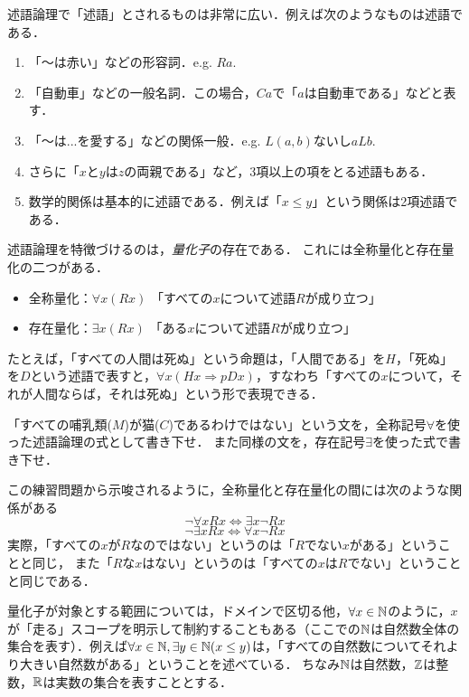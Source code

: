 \documentclass[11pt,a4paper]{jsarticle}
\begin{document}
述語論理で「述語」とされるものは非常に広い．例えば次のようなものは述語である．
\begin{enumerate}
    \item 「〜は赤い」などの形容詞．e.g. $Ra$.
    \item 「自動車」などの一般名詞．この場合，$Ca$で「$a$は自動車である」などと表す．
    \item 「〜は...を愛する」などの関係一般．e.g. $L(a,b)$ないし$aLb$. 
    \item さらに「$x$と$y$は$z$の両親である」など，3項以上の項をとる述語もある．
    \item 数学的関係は基本的に述語である．例えば「$x \leq y$」という関係は2項述語である．
\end{enumerate}

述語論理を特徴づけるのは，\emph{量化子}の存在である．
これには全称量化と存在量化の二つがある．
\begin{itemize}
 \item 全称量化：$\forall x (Rx)$ 「すべての$x$について述語$R$が成り立つ」
 \item 存在量化：$\exists x (Rx)$ 「ある$x$について述語$R$が成り立つ」
\end{itemize}
たとえば，「すべての人間は死ぬ」という命題は，「人間である」を$H$，「死ぬ」を$D$という述語で表すと，$\forall x (Hx \Rightarrow pDx)$，すなわち「すべての$x$について，それが人間ならば，それは死ぬ」という形で表現できる．

\begin{exercise}
    「すべての哺乳類($M$)が猫($C$)であるわけではない」という文を，全称記号$\forall$を使った述語論理の式として書き下せ．
    また同様の文を，存在記号$\exists$を使った式で書き下せ．
\end{exercise}

この練習問題から示唆されるように，全称量化と存在量化の間には次のような関係がある
\[ \neg \forall x Rx \iff \exists x \neg Rx \]
\[ \neg \exists x Rx \iff \forall x \neg Rx \]
実際，「すべての$x$が$R$なのではない」というのは「$R$でない$x$がある」ということと同じ，
また「$R$な$x$はない」というのは「すべての$x$は$R$でない」ということと同じである．

量化子が対象とする範囲については，ドメインで区切る他，$\forall x \in \mathbb{N}$のように，$x$が「走る」スコープを明示して制約することもある（ここでの$\mathbb{N}$は自然数全体の集合を表す）．例えば$\forall x \in \mathbb{N}, \exists y \in \mathbb{N} (x \leq y)$は，「すべての自然数についてそれより大きい自然数がある」ということを述べている．
ちなみ$\mathbb{N}$は自然数，$\mathbb{Z}$は整数，$\mathbb{R}$は実数の集合を表すこととする．
\end{document}
